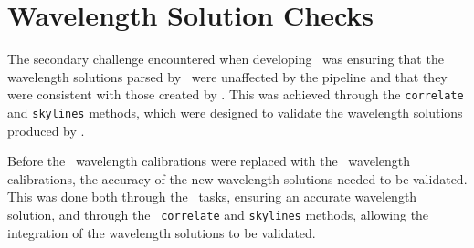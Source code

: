 



\section{Wavelength Solution Checks} \label{sec:test_wav}

The secondary challenge encountered when developing \stops\ was ensuring that the wavelength solutions parsed by \stops\ were unaffected by the pipeline and that they were consistent with those created by \polsalt. This was achieved through the \texttt{correlate} and \texttt{skylines} methods, which were designed to validate the wavelength solutions produced by \iraf.

Before the \polsalt\ wavelength calibrations were replaced with the \iraf\ wavelength calibrations, the accuracy of the new wavelength solutions needed to be validated. This was done both through the \iraf\ tasks, ensuring an accurate wavelength solution, and through the \stops\ \texttt{correlate} and \texttt{skylines} methods, allowing the integration of the wavelength solutions to be validated.

